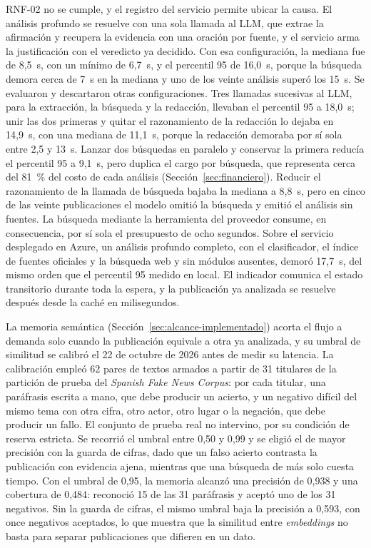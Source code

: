 RNF-02 no se cumple, y el registro del servicio permite ubicar la causa. El análisis profundo se resuelve con una sola llamada al LLM, que extrae la afirmación y recupera la evidencia con una oración por fuente, y el servicio arma la justificación con el veredicto ya decidido. Con esa configuración, la mediana fue de 8,5~s, con un mínimo de 6,7~s, y el percentil 95 de 16,0~s, porque la búsqueda demora cerca de 7~s en la mediana y uno de los veinte análisis superó los 15~s. Se evaluaron y descartaron otras configuraciones. Tres llamadas sucesivas al LLM, para la extracción, la búsqueda y la redacción, llevaban el percentil 95 a 18,0~s; unir las dos primeras y quitar el razonamiento de la redacción lo dejaba en 14,9~s, con una mediana de 11,1~s, porque la redacción demoraba por sí sola entre 2,5 y 13~s. Lanzar dos búsquedas en paralelo y conservar la primera reducía el percentil 95 a 9,1~s, pero duplica el cargo por búsqueda, que representa cerca del 81~\% del costo de cada análisis (Sección~\ref{sec:financiero}). Reducir el razonamiento de la llamada de búsqueda bajaba la mediana a 8,8~s, pero en cinco de las veinte publicaciones el modelo omitió la búsqueda y emitió el análisis sin fuentes. La búsqueda mediante la herramienta del proveedor consume, en consecuencia, por sí sola el presupuesto de ocho segundos. Sobre el servicio desplegado en Azure, un análisis profundo completo, con el clasificador, el índice de fuentes oficiales y la búsqueda web y sin módulos ausentes, demoró 17,7~s, del mismo orden que el percentil 95 medido en local. El indicador comunica el estado transitorio durante toda la espera, y la publicación ya analizada se resuelve después desde la caché en milisegundos.

La memoria semántica (Sección~\ref{sec:alcance-implementado}) acorta el flujo a demanda solo cuando la publicación equivale a otra ya analizada, y su umbral de similitud se calibró el 22 de octubre de 2026 antes de medir su latencia. La calibración empleó 62 pares de textos armados a partir de 31 titulares de la partición de prueba del \textit{Spanish Fake News Corpus}: por cada titular, una paráfrasis escrita a mano, que debe producir un acierto, y un negativo difícil del mismo tema con otra cifra, otro actor, otro lugar o la negación, que debe producir un fallo. El conjunto de prueba real no intervino, por su condición de reserva estricta. Se recorrió el umbral entre 0,50 y 0,99 y se eligió el de mayor precisión con la guarda de cifras, dado que un falso acierto contrasta la publicación con evidencia ajena, mientras que una búsqueda de más solo cuesta tiempo. Con el umbral de 0,95, la memoria alcanzó una precisión de 0,938 y una cobertura de 0,484: reconoció 15 de las 31 paráfrasis y aceptó uno de los 31 negativos. Sin la guarda de cifras, el mismo umbral baja la precisión a 0,593, con once negativos aceptados, lo que muestra que la similitud entre \textit{embeddings} no basta para separar publicaciones que difieren en un dato.

